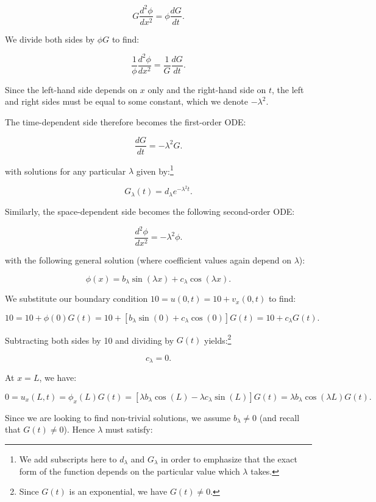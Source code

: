 \begin{solution}
    $$
    G \frac{d^2 \phi}{d x^2} = \phi \frac{d G}{d t}.
    $$

    \pagebreak
    We divide both sides by $\phi G$ to find:

    $$
    \frac{1}{\phi} \frac{d^2 \phi}{d x^2} = \frac{1}{G} \frac{d G}{d t}.
    $$

    Since the left-hand side depends on $x$ only and the right-hand side on $t$, the left and right sides must be equal
    to some constant, which we denote $-\lambda^2$.

    The time-dependent side therefore becomes the first-order ODE:

    $$
    \frac{d G}{d t} = -\lambda^2 G.
    $$

    with solutions for any particular $\lambda$ given by:\footnote{
        We add subscripts here to $d_{\lambda}$ and $G_{\lambda}$ in order to emphasize that the exact form of the 
        function depends on the particular value which $\lambda$ takes.
    }

    $$
    G_{\lambda}(t) = d_{\lambda}e^{-\lambda^2 t}.
    $$

    Similarly, the space-dependent side becomes the following second-order ODE:

    $$
    \frac{d^2 \phi}{d x^2} = -\lambda^2 \phi.
    $$

    with the following general solution (where coefficient values again depend on $\lambda$):

    $$
    \phi(x) = b_{\lambda} \sin{(\lambda x)} + c_{\lambda} \cos{(\lambda x)}.
    $$

    We substitute our boundary condition $10 = u(0, t) = 10 + v_x(0, t)$ to find:

    $$
    10 = 10 + \phi(0) G(t) = 10 + \left[b_{\lambda} \sin{(0)} + c_{\lambda} \cos{(0)}\right] G(t) = 10 + c_{\lambda} G(t).
    $$

    Subtracting both sides by 10 and dividing by $G(t)$ yields:\footnote{
        Since $G(t)$ is an exponential, we have $G(t) \neq 0$.
    }

    $$
    c_{\lambda} = 0.
    $$

    At $x = L$, we have:

    $$
    0 = u_x(L, t) 
      = \phi_x(L) G(t) 
      = \left[\lambda b_{\lambda} \cos{(L)} - \lambda c_{\lambda} \sin{(L)}\right] G(t) 
      = \lambda b_{\lambda} \cos{(\lambda L)} G(t).
    $$

    Since we are looking to find non-trivial solutions, we assume $b_{\lambda} \neq 0$ (and recall that $G(t) \neq 0$).
    Hence $\lambda$ must satisfy:


\end{solution}
